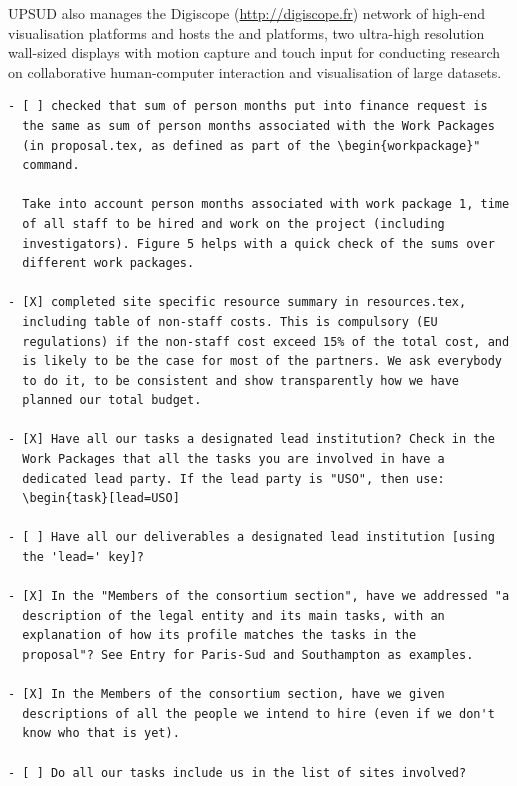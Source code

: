 \begin{sitedescription}{UPSUD}
 also manages the Digiscope (\url{http://digiscope.fr}) network of high-end visualisation platforms and hosts the  and  platforms, two ultra-high resolution wall-sized displays with motion capture and touch input for conducting research on collaborative human-computer interaction and visualisation of
large datasets.

\end{sitedescription}



\begin{draft}
\vspace{1cm}

\begin{verbatim}
- [ ] checked that sum of person months put into finance request is
  the same as sum of person months associated with the Work Packages
  (in proposal.tex, as defined as part of the \begin{workpackage}"
  command.

  Take into account person months associated with work package 1, time
  of all staff to be hired and work on the project (including
  investigators). Figure 5 helps with a quick check of the sums over
  different work packages.

- [X] completed site specific resource summary in resources.tex,
  including table of non-staff costs. This is compulsory (EU
  regulations) if the non-staff cost exceed 15% of the total cost, and
  is likely to be the case for most of the partners. We ask everybody
  to do it, to be consistent and show transparently how we have
  planned our total budget.

- [X] Have all our tasks a designated lead institution? Check in the
  Work Packages that all the tasks you are involved in have a
  dedicated lead party. If the lead party is "USO", then use:
  \begin{task}[lead=USO]

- [ ] Have all our deliverables a designated lead institution [using
  the 'lead=' key]?

- [X] In the "Members of the consortium section", have we addressed "a
  description of the legal entity and its main tasks, with an
  explanation of how its profile matches the tasks in the
  proposal"? See Entry for Paris-Sud and Southampton as examples.

- [X] In the Members of the consortium section, have we given
  descriptions of all the people we intend to hire (even if we don't
  know who that is yet).

- [ ] Do all our tasks include us in the list of sites involved?
\end{verbatim}
\end{draft}

